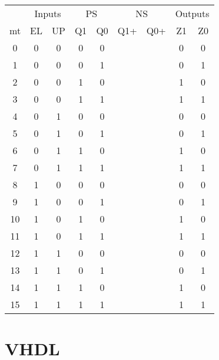 \documentclass{article}
\begin{document}
\begin{table}[hbtp]
  \centering
  \begin{tabular}{c|cc|cc|cc|cc}
 & \multicolumn{2}{c|}{Inputs} & \multicolumn{2}{c|}{PS} & \multicolumn{2}{c|}{NS} & \multicolumn{2}{c}{Outputs} \\
mt    &	EL     & UP & Q1 & Q0    & Q1+ & Q0+ & Z1 & Z0 \\
\hline
0     &	0      & 0  & 0  & 0     &     &     & 0  & 0  \\
1     &	0      & 0  & 0  & 1     &     &     & 0  & 1  \\
2     &	0      & 0  & 1  & 0     &     &     & 1  & 0  \\
3     &	0      & 0  & 1  & 1     &     &     & 1  & 1  \\
4     &	0      & 1  & 0  & 0     &     &     & 0  & 0  \\
5     &	0      & 1  & 0  & 1     &     &     & 0  & 1  \\
6     &	0      & 1  & 1  & 0     &     &     & 1  & 0  \\
7     &	0      & 1  & 1  & 1     &     &     & 1  & 1  \\
8     &	1      & 0  & 0  & 0     &     &     & 0  & 0  \\
9     &	1      & 0  & 0  & 1     &     &     & 0  & 1  \\
10    &	1      & 0  & 1  & 0     &     &     & 1  & 0  \\
11    &	1      & 0  & 1  & 1     &     &     & 1  & 1  \\
12    &	1      & 1  & 0  & 0     &     &     & 0  & 0  \\
13    &	1      & 1  & 0  & 1     &     &     & 0  & 1  \\
14    &	1      & 1  & 1  & 0     &     &     & 1  & 0  \\
15    &	1      & 1  & 1  & 1     &     &     & 1  & 1  \\
\end{tabular}
  \caption{\label{tab:values} }
\end{table}

\section{VHDL}
\label{sec:vhdl}
\end{document}
